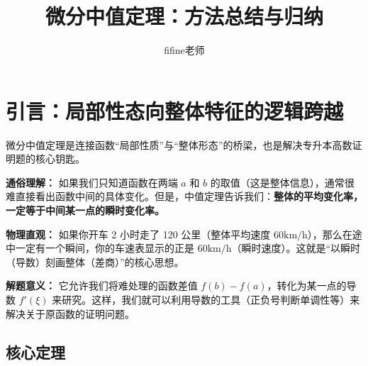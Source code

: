 \documentclass[UTF8]{ctexart}
\begin{document}
\title{\textbf{微分中值定理：方法总结与归纳}}
\author{fifine老师}
\date{}
\maketitle


\section{引言：局部性态向整体特征的逻辑跨越}
微分中值定理是连接函数“局部性质”与“整体形态”的桥梁，也是解决专升本高数证明题的核心钥匙。

\textbf{通俗理解：}
如果我们只知道函数在两端 $a$ 和 $b$ 的取值（这是整体信息），通常很难直接看出函数中间的具体变化。但是，中值定理告诉我们：\textbf{整体的平均变化率，一定等于中间某一点的瞬时变化率。}

\textbf{物理直观：}
如果你开车 2 小时走了 120 公里（整体平均速度 $60\text{km/h}$），那么在途中一定有一个瞬间，你的车速表显示的正是 $60\text{km/h}$（瞬时速度）。这就是“以瞬时（导数）刻画整体（差商）”的核心思想。

\textbf{解题意义：}
它允许我们将难处理的函数差值 $f(b)-f(a)$，转化为某一点的导数 $f'(\xi)$ 来研究。这样，我们就可以利用导数的工具（正负号判断单调性等）来解决关于原函数的证明问题。

\subsection*{核心定理}
\end{document}
